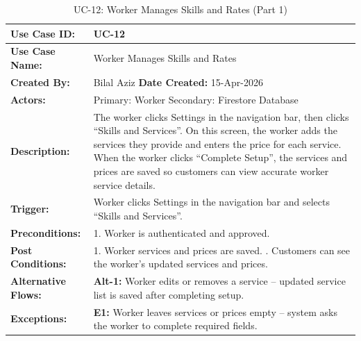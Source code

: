 {\small
\renewcommand{\arraystretch}{1.05}
\begin{table}[H]
\centering
\begin{tabular}{|p{3cm}|p{11.2cm}|}
\hline
\textbf{Use Case ID:} & UC-12 \\ \hline
\textbf{Use Case Name:} & Worker Manages Skills and Rates \\ \hline
\textbf{Created By:} & Bilal Aziz \hfill \textbf{Date Created:} 15-Apr-2026 \\ \hline
\textbf{Actors:} & Primary: Worker \quad Secondary: Firestore Database \\ \hline
\textbf{Description:} & The worker clicks Settings in the navigation bar, then clicks ``Skills and Services''. On this screen, the worker adds the services they provide and enters the price for each service. When the worker clicks ``Complete Setup'', the services and prices are saved so customers can view accurate worker service details. \\ \hline
\textbf{Trigger:} & Worker clicks Settings in the navigation bar and selects ``Skills and Services''. \\ \hline
\textbf{Preconditions:} & 1. Worker is authenticated and approved. \\ \hline
\textbf{Post Conditions:} & 1. Worker services and prices are saved. \newline 2. Customers can see the worker's updated services and prices. \\ \hline
\textbf{Alternative Flows:} & \textbf{Alt-1:} Worker edits or removes a service -- updated service list is saved after completing setup. \\ \hline
\textbf{Exceptions:} & \textbf{E1:} Worker leaves services or prices empty -- system asks the worker to complete required fields. \\ \hline
\end{tabular}
\caption*{UC-12: Worker Manages Skills and Rates (Part 1)}
\end{table}
}

\newpage

